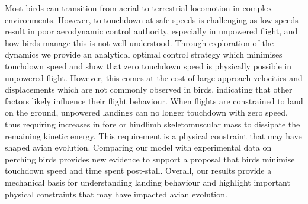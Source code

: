 Most birds can transition from aerial to terrestrial locomotion in complex environments. However, to touchdown at safe speeds is challenging as low speeds result in poor aerodynamic control authority, especially in unpowered flight, and how birds manage this is not well understood. Through exploration of the dynamics we provide an analytical optimal control strategy which minimises touchdown speed and show that zero touchdown speed is physically possible in unpowered flight. However, this comes at the cost of large approach velocities and displacements which are not commonly observed in birds, indicating that other factors likely influence their flight behaviour. When flights are constrained to land on the ground, unpowered landings can no longer touchdown with zero speed, thus requiring increases in fore or hindlimb skeletomuscular mass to dissipate the remaining kinetic energy. This requirement is a physical constraint that may have shaped avian evolution. Comparing our model with experimental data on perching birds provides new evidence to support a proposal that birds minimise touchdown speed and time spent post-stall. Overall, our results provide a mechanical basis for understanding landing behaviour and highlight important physical constraints that may have impacted avian evolution.
